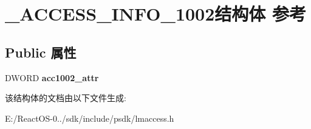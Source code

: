 \hypertarget{struct___a_c_c_e_s_s___i_n_f_o__1002}{}\section{\+\_\+\+A\+C\+C\+E\+S\+S\+\_\+\+I\+N\+F\+O\+\_\+1002结构体 参考}
\label{struct___a_c_c_e_s_s___i_n_f_o__1002}
\subsection*{Public 属性}
\begin{DoxyCompactItemize}
\item 
\mbox{\label{struct___a_c_c_e_s_s___i_n_f_o__1002_ab977c1c383102d094543d73666730364}} 
D\+W\+O\+RD {\bfseries acc1002\+\_\+attr}
\end{DoxyCompactItemize}


该结构体的文档由以下文件生成\+:\begin{DoxyCompactItemize}
\item 
E\+:/\+React\+O\+S-\/0../sdk/include/psdk/lmaccess.\+h\end{DoxyCompactItemize}
